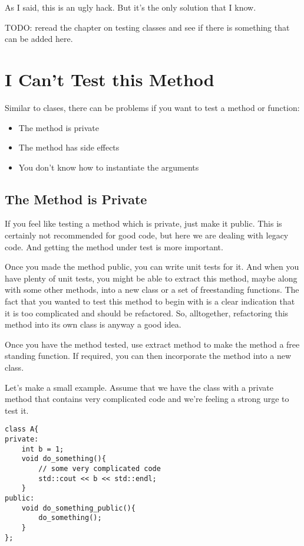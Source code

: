As I said, this is an ugly hack. But it's the only solution that I know.

TODO: reread the chapter on testing classes and see if there is something that can be added here.

\section{I Can't Test this Method}

Similar to clases, there can be problems if you want to test a method or function:

\begin{itemize}
\item The method is private
\item The method has side effects
\item You don't know how to instantiate the arguments
\end{itemize}

\subsection{The Method is Private}

If you feel like testing a method which is private, just make it public. This is certainly not recommended for good code, but here we are dealing with legacy code. And getting the method under test is more important.

Once you made the method public, you can write unit tests for it. And when you have plenty of unit tests, you might be able to extract this method, maybe along with some other methods, into a new class or a set of freestanding functions. The fact that you wanted to test this method to begin with is a clear indication that it is too complicated and should be refactored. So, alltogether, refactoring this method into its own class is anyway a good idea.

Once you have the method tested, use extract method to make the method a free standing function. If required, you can then incorporate the method into a new class.

Let's make a small example. Assume that we have the class  with a private method  that contains very complicated code and we're feeling a strong urge to test it.

\begin{programcode}{}
\begin{verbatim}
class A{
private:
    int b = 1;
    void do_something(){
        // some very complicated code
        std::cout << b << std::endl;
    }
public:
    void do_something_public(){
        do_something();
    }
};
\end{verbatim}
\end{programcode}

